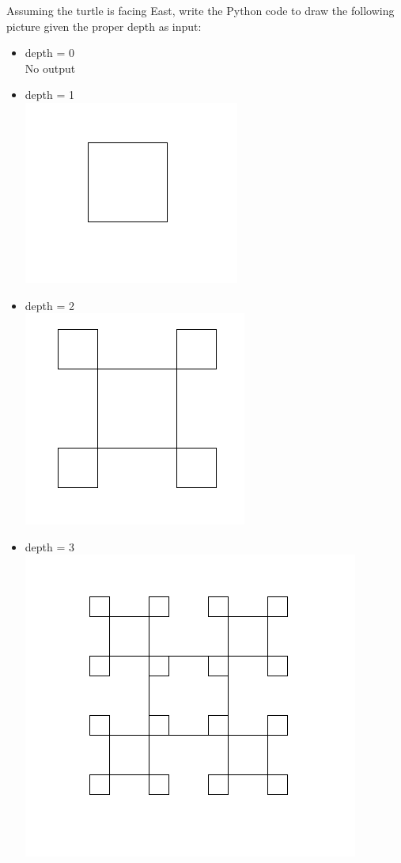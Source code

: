 %
%


Assuming the turtle is facing East, write the Python code to draw the following picture given the proper depth as input:
    \begin{itemize}
            \item depth = 0
           \\No output 
            \item depth = 1\\
            \includegraphics[scale=0.4]{other/1.png}
            \item depth = 2 \\
            \includegraphics[scale=0.4]{other/2.png}
            \item depth = 3\\
            \includegraphics[scale=0.4]{other/3.png}
        \end{itemize}
